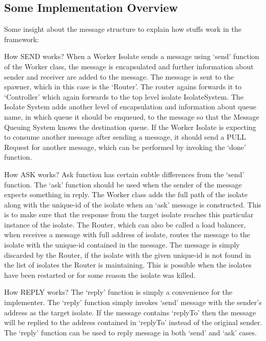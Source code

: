 \subsection{Some Implementation Overview}
  Some insight about the message structure to explain how stuffs work in the framework:
  \begin{description}
    \item How SEND works?
      When a Worker Isolate sends a message using ‘send’ function of the Worker class, the message is encapsulated and further information about sender and receiver are added to the message. The message is sent to the spawner, which in this case is the ‘Router’. The router agains forwards it to ‘Controller’ which again forwards to the top level isolate \textendash{} IsolateSystem. The Isolate System adds another level of encapsulation and information about queue name, in which queue it should be enqueued, to the message so that the Message Queuing System knows the destination queue.
      If the Worker Isolate is expecting to consume another message after sending a message, it should send a PULL Request for another message, which can be performed by invoking the ‘done’ function.

    \item How ASK works?
    Ask function has certain subtle differences from the ‘send’ function. The ‘ask’ function should be used when the sender of the message expects something in reply. The Worker class adds the full path of the isolate along with the unique-id of the isolate when an ‘ask’ message is constructed. This is to make sure that the response from the target isolate reaches this particular instance of the isolate. The Router, which can also be called a load balancer, when receives a message with full address of isolate, routes the message to the isolate with the unique-id contained in the message. The message is simply discarded by the Router, if the isolate with the given unique-id is not found in the list of isolates the Router is maintaining. This is possible when the isolates have been restarted or for some reason the isolate was killed.

    \item How REPLY works?
    The ‘reply’ function is simply a convenience for the implementer. The ‘reply’ function simply invokes ‘send’ message with the sender’s address as the target isolate. If the message contains ‘replyTo’ then the message will be replied to the address contained in ‘replyTo’ instead of the original sender. The ‘reply’ function can be used to reply message in both \textendash{} ‘send’ and ‘ask’ cases.


\end{description}
